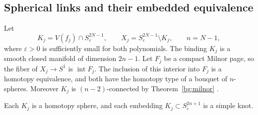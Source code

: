 \subsection{Spherical links and their embedded equivalence}

Let
\[
 K_j=V(f_j)\cap S^{2N-1}_\varepsilon,
 \qquad
 X_j=S^{2N-1}_\varepsilon\setminus K_j,
 \qquad n=N-1,
\]
where $\varepsilon>0$ is sufficiently small for both polynomials.
The binding $K_j$ is a smooth closed manifold of dimension $2n-1$.
Let $F_j$ be a compact Milnor page, so the fiber of $X_j\to S^1$ is
$\operatorname{int}F_j$.  The inclusion of this interior into $F_j$ is a
homotopy equivalence, and both have the homotopy type of a bouquet of
$n$-spheres.  Moreover $K_j$ is $(n-2)$-connected
by Theorem~\ref{bg:milnor} \cite{Milnor1968}.

\begin{lemma}
\label{topo:sphere}
Each $K_j$ is a homotopy sphere, and each embedding
$K_j\subset S^{2n+1}_\varepsilon$ is a simple knot.
\end{lemma}

